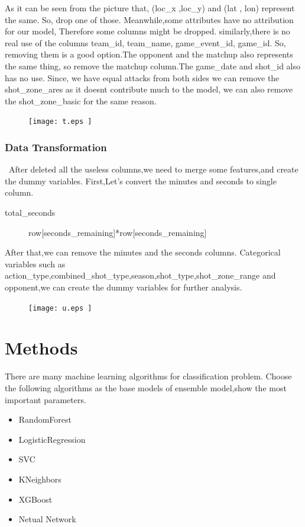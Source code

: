 As it can be seen from 
the picture that, (loc_x ,loc_y) and (lat , lon) represent the same.
So, drop one of those.
Meanwhile,some attributes have no attribution for our model,
Therefore some columns might be dropped.
similarly,there is no real use of the columns team_id, team_name, game_event_id, game_id.
So, removing them is a good option.The opponent and the matchup also represents the same thing, 
so remove the matchup column.The game_date and shot_id also has no use.
Since, we have equal attacks from both sides we can remove the shot_zone_ares as it
 doesnt contribute much to the model, we can also remove the shot_zone_basic for the same reason.


\begin{figure}[htbp]
	\centering
	\texttt{[image: t.eps
	]}        %
	\label{fig8}
\end{figure}


\subsubsection{Data Transformation}
\
After deleted all the useless columns,we need to merge some features,and create the dummy variables.
First,Let's convert the minutes and seconds to single column.
\begin{description}
	\item[total\_seconds] row[seconds\_remaining]*row[seconds\_remaining] 
\end{description}
After that,we can remove the minutes and the seconds columns.
Categorical variables such as action_type,combined_shot_type,season,shot_type,shot_zone_range 
and opponent,we can create the dummy variables for further analysis.
\begin{figure}[htbp]
	\centering
	\texttt{[image: u.eps
	]}        %
	\label{fig8}
\end{figure}

\section{Methods}

There are many machine learning algorithms 
for classification problem. 
Choose the following algorithms
as the base models of ensemble model,show the most important parameters.

\begin{itemize}
	\item RandomForest 
	\item LogisticRegression
	\item SVC
	\item KNeighbors 
	\item XGBoost
	\item Netual Network
\end{itemize}
